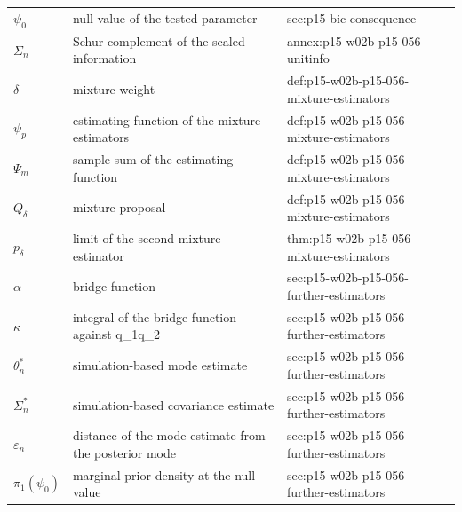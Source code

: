\begin{longtable}{@{}p{}p{}p{}@{}}
\(\psi_0\) & null value of the tested parameter & sec:\allowbreak{}p15-\allowbreak{}bic-\allowbreak{}consequence \\
\(\Sigma_n\) & Schur complement of the scaled information & annex:\allowbreak{}p15-\allowbreak{}w02b-\allowbreak{}p15-\allowbreak{}056-\allowbreak{}unitinfo \\
\(\delta\) & mixture weight & def:\allowbreak{}p15-\allowbreak{}w02b-\allowbreak{}p15-\allowbreak{}056-\allowbreak{}mixture-\allowbreak{}estimators \\
\(\psi_p\) & estimating function of the mixture estimators & def:\allowbreak{}p15-\allowbreak{}w02b-\allowbreak{}p15-\allowbreak{}056-\allowbreak{}mixture-\allowbreak{}estimators \\
\(\Psi_m\) & sample sum of the estimating function & def:\allowbreak{}p15-\allowbreak{}w02b-\allowbreak{}p15-\allowbreak{}056-\allowbreak{}mixture-\allowbreak{}estimators \\
\(Q_\delta\) & mixture proposal & def:\allowbreak{}p15-\allowbreak{}w02b-\allowbreak{}p15-\allowbreak{}056-\allowbreak{}mixture-\allowbreak{}estimators \\
\(p_\delta\) & limit of the second mixture estimator & thm:\allowbreak{}p15-\allowbreak{}w02b-\allowbreak{}p15-\allowbreak{}056-\allowbreak{}mixture-\allowbreak{}estimators \\
\(\alpha\) & bridge function & sec:\allowbreak{}p15-\allowbreak{}w02b-\allowbreak{}p15-\allowbreak{}056-\allowbreak{}further-\allowbreak{}estimators \\
\(\kappa\) & integral of the bridge function against q\_1q\_2 & sec:\allowbreak{}p15-\allowbreak{}w02b-\allowbreak{}p15-\allowbreak{}056-\allowbreak{}further-\allowbreak{}estimators \\
\(\theta^*_n\) & simulation-based mode estimate & sec:\allowbreak{}p15-\allowbreak{}w02b-\allowbreak{}p15-\allowbreak{}056-\allowbreak{}further-\allowbreak{}estimators \\
\(\Sigma^*_n\) & simulation-based covariance estimate & sec:\allowbreak{}p15-\allowbreak{}w02b-\allowbreak{}p15-\allowbreak{}056-\allowbreak{}further-\allowbreak{}estimators \\
\(\varepsilon_n\) & distance of the mode estimate from the posterior mode & sec:\allowbreak{}p15-\allowbreak{}w02b-\allowbreak{}p15-\allowbreak{}056-\allowbreak{}further-\allowbreak{}estimators \\
\(\pi_1(\psi_0)\) & marginal prior density at the null value & sec:\allowbreak{}p15-\allowbreak{}w02b-\allowbreak{}p15-\allowbreak{}056-\allowbreak{}further-\allowbreak{}estimators \\

\end{longtable}
